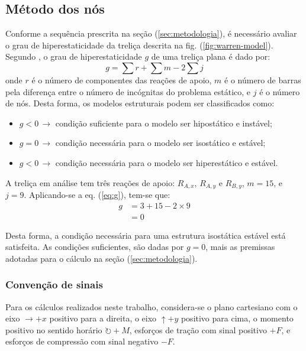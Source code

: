 \documentclass[a4paper, 12pt]{article} %
\begin{document}
\subsection{Método dos nós}
Conforme a sequência prescrita na seção (\ref{sec:metodologia}), é necessário avaliar o grau de hiperestaticidade da treliça descrita na fig. (\ref{fig:warren-model}). Segundo \cite{martha}, o grau de hiperestaticidade $g$ de uma treliça plana é dado por:
\begin{equation}
    g = \sum r + \sum m - 2\sum j \label{eq:g} 
\end{equation}
onde $r$ é o número de componentes das reações de apoio, $m$ é o número de barras
pela diferença entre o número de incógnitas do problema estático, e $j$ é o número de nós. Desta forma, os modelos estruturais podem ser classificados como:
\begin{itemize}
    \item $g < 0\,\rightarrow$ condição suficiente para o modelo ser hipostático e instável;
    \item $g = 0\,\rightarrow$ condição necessária para o modelo ser isostático e estável;
    \item $g < 0\,\rightarrow$ condição necessária para o modelo ser hiperestático e estável.
    
\end{itemize}

A treliça em análise tem três reações de apoio: $R_{A,x},\, R_{A,y}$ e $R_{B,y}$, $m = 15$, e $j = 9$. Aplicando-se a eq. (\ref{eq:g}), tem-se que:
\begin{align}
    g & = 3 + 15 - 2\times 9\\
      & = 0
\end{align} 

Desta forma, a condição necessária para uma estrutura isostática estável está satisfeita. As condições suficientes, são dadas por $g = 0$, mais as premissas adotadas para o cálculo na seção (\ref{sec:metodologia}). 

\subsubsection{Convenção de sinais}
Para os cálculos realizados neste trabalho, considera-se o plano cartesiano com o eixo $\rightarrow +x$ positivo para a direita, o eixo $\uparrow +y$ positivo para cima, o momento positivo no sentido horário $\circlearrowright +M$, esforços de tração com sinal positivo $+F$, e esforços de compressão com sinal negativo $-F$.
\end{document}
